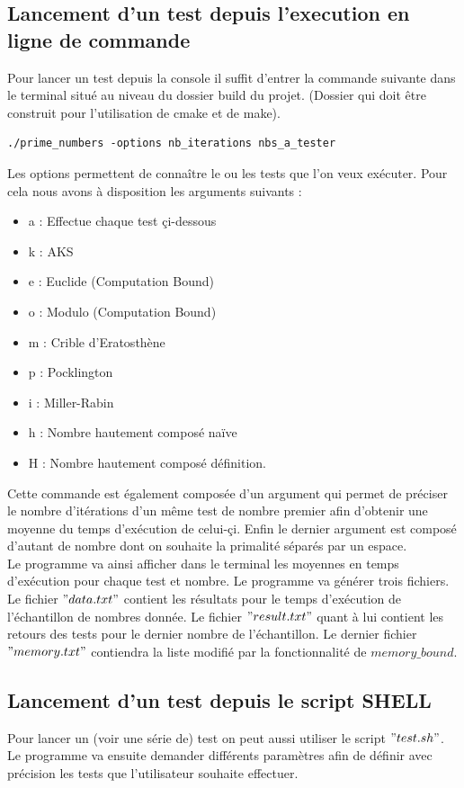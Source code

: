 		 \subsection{Lancement d'un test depuis l'execution en ligne de commande}
Pour lancer un test depuis la console il suffit d'entrer la commande suivante dans le terminal situé au niveau du dossier build du projet. (Dossier qui doit être construit pour l'utilisation de cmake et de make).
\begin{lstlisting}
./prime_numbers -options nb_iterations nbs_a_tester \end{lstlisting}

Les options permettent de connaître le ou les tests que l'on veux exécuter. Pour cela nous avons à disposition les arguments suivants :
\begin{itemize}
\item a : Effectue chaque test çi-dessous
\item k : AKS
\item e : Euclide (Computation Bound)
\item o : Modulo (Computation Bound)
\item m : Crible d'Eratosthène
\item p : Pocklington
\item i : Miller-Rabin
\item h : Nombre hautement composé naïve
\item H : Nombre hautement composé définition.
\end{itemize}

Cette commande est également composée d'un argument qui permet de préciser le nombre d'itérations d'un même test de nombre premier afin d'obtenir une moyenne du temps d’exécution de celui-çi. Enfin le dernier argument est composé d'autant de nombre dont on souhaite  la primalité séparés par un espace.\\
Le programme va ainsi afficher dans le terminal les moyennes en temps d’exécution pour chaque test et nombre. Le programme va générer trois fichiers. Le fichier $"data.txt"$ contient les résultats pour le temps d'exécution de l'échantillon de nombres donnée. Le fichier $"result.txt"$ quant à lui contient les retours des tests pour le dernier nombre de l'échantillon. Le dernier fichier $"memory.txt"$ contiendra la liste modifié par la fonctionnalité de $memory\_bound$.

\subsection{Lancement d'un test depuis le script SHELL}
Pour lancer un (voir une série de) test on peut aussi utiliser le script $"test.sh"$. \\
Le programme va ensuite demander différents paramètres afin de définir avec précision les tests que l'utilisateur souhaite effectuer. \\

